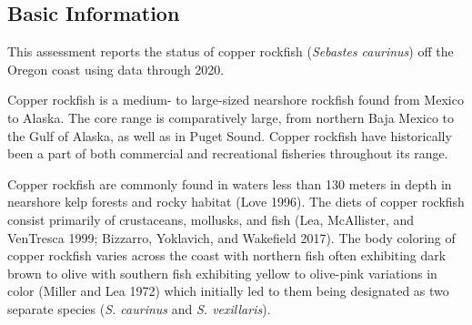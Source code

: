 \documentclass[11pt,
  english,
  a4paper,
]{article}
\begin{document}
\leavevmode\tagmcend\tagstructend


\hypertarget{basic-information}{%
\subsection{Basic Information}\label{basic-information}}

\leavevmode\tagmcend\tagstructend


This assessment reports the status of copper rockfish (\emph{Sebastes caurinus}) off the Oregon coast using data through 2020.

\leavevmode\tagmcend\tagstructend\par


Copper rockfish is a medium- to large-sized nearshore rockfish found from Mexico to Alaska. The core range is comparatively large, from northern Baja Mexico to the Gulf of Alaska, as well as in Puget Sound. Copper rockfish have historically been a part of both commercial and recreational fisheries throughout its range.

\leavevmode\tagmcend\tagstructend\par


Copper rockfish are commonly found in waters less than 130 meters in depth in nearshore kelp forests and rocky habitat {(Love 1996)\leavevmode\tagmcend\tagstructend}. The diets of copper rockfish consist primarily of crustaceans, mollusks, and fish {(Lea, McAllister, and VenTresca 1999; Bizzarro, Yoklavich, and Wakefield 2017)\leavevmode\tagmcend\tagstructend}. The body coloring of copper rockfish varies across the coast with northern fish often exhibiting dark brown to olive with southern fish exhibiting yellow to olive-pink variations in color {(Miller and Lea 1972)\leavevmode\tagmcend\tagstructend} which initially led to them being designated as two separate species (\emph{S. caurinus} and \emph{S. vexillaris}).

\leavevmode\tagmcend\tagstructend\par

\end{document}
